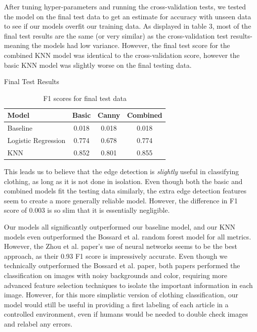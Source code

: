 After tuning hyper-parameters and running the cross-validation tests, we tested the model on the final test data to get an estimate for accuracy with unseen data to see if our models overfit our training data. As displayed in table 3, most of the final test results are the same (or very similar) as the cross-validation test results-meaning the models had low variance. However, the final test score for the combined KNN model was identical to the cross-validation score, however the basic KNN model was slightly worse on the final testing data. 

\begin{table}[!h]
    \begin{center}
        Final Test Results\\
    \begin{tabular}{|l|c c c|}
    \hline
         Model & Basic & Canny & Combined\\
         \hline
         Baseline & 0.018 & 0.018 & 0.018\\
         Logistic Regression & 0.774 & 0.678 & 0.774\\
         KNN & 0.852 & 0.801 & 0.855\\
         \hline
    \end{tabular}
    \caption{F1 scores for final test data}
    \label{tab:my_label}
    \end{center}
\end{table}

This leads us to believe that the edge detection is \textit{slightly} useful in classifying clothing, as long as it is not done in isolation. Even though both the basic and combined models fit the testing data similarly, the extra edge detection features seem to create a more generally reliable model. However, the difference in F1 score of 0.003 is so slim that it is essentially negligible.

Our models all significantly outperformed our baseline model, and our KNN models even outperformed the Bossard et al. random forest model for all metrics. However, the Zhou et al. paper's use of neural networks seems to be the best approach, as their 0.93 F1 score is impressively accurate. Even though we technically outperformed the Bossard et al. paper, both papers performed the classification on images with noisy backgrounds and color, requiring more advanced feature selection techniques to isolate the important information in each image. However, for this more simplistic version of clothing classification, our model would still be useful in providing a first labeling of each article in a controlled environment, even if humans would be needed to double check images and relabel any errors.





